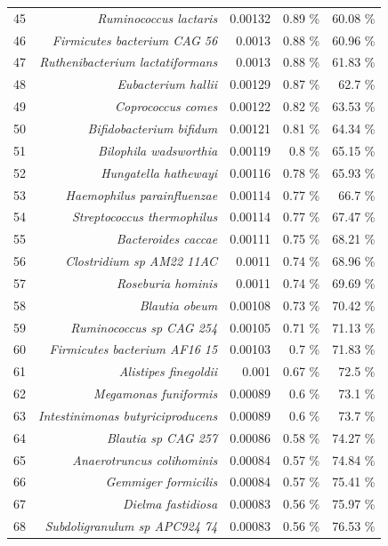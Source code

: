 \documentclass{article}
\begin{document}
\begin{table}
\begin{centering}
\begin{tabular}{|r|r|r|r|r|}
  45 & \textit{Ruminococcus lactaris} & 0.00132 & 0.89 \% & 60.08 \% \\
  46 & \textit{Firmicutes bacterium CAG 56} & 0.0013 & 0.88 \% & 60.96 \% \\
  47 & \textit{Ruthenibacterium lactatiformans} & 0.0013 & 0.88 \% & 61.83 \% \\
  48 & \textit{Eubacterium hallii} & 0.00129 & 0.87 \% & 62.7 \% \\
  49 & \textit{Coprococcus comes} & 0.00122 & 0.82 \% & 63.53 \% \\
  50 & \textit{Bifidobacterium bifidum} & 0.00121 & 0.81 \% & 64.34 \% \\
  51 & \textit{Bilophila wadsworthia} & 0.00119 & 0.8 \% & 65.15 \% \\
  52 & \textit{Hungatella hathewayi} & 0.00116 & 0.78 \% & 65.93 \% \\
  53 & \textit{Haemophilus parainfluenzae} & 0.00114 & 0.77 \% & 66.7 \% \\
  54 & \textit{Streptococcus thermophilus} & 0.00114 & 0.77 \% & 67.47 \% \\
  55 & \textit{Bacteroides caccae} & 0.00111 & 0.75 \% & 68.21 \% \\
  56 & \textit{Clostridium sp AM22 11AC} & 0.0011 & 0.74 \% & 68.96 \% \\
  57 & \textit{Roseburia hominis} & 0.0011 & 0.74 \% & 69.69 \% \\
  58 & \textit{Blautia obeum} & 0.00108 & 0.73 \% & 70.42 \% \\
  59 & \textit{Ruminococcus sp CAG 254} & 0.00105 & 0.71 \% & 71.13 \% \\
  60 & \textit{Firmicutes bacterium AF16 15} & 0.00103 & 0.7 \% & 71.83 \% \\
  61 & \textit{Alistipes finegoldii} & 0.001 & 0.67 \% & 72.5 \% \\
  62 & \textit{Megamonas funiformis} & 0.00089 & 0.6 \% & 73.1 \% \\
  63 & \textit{Intestinimonas butyriciproducens} & 0.00089 & 0.6 \% & 73.7 \% \\
  64 & \textit{Blautia sp CAG 257} & 0.00086 & 0.58 \% & 74.27 \% \\
  65 & \textit{Anaerotruncus colihominis} & 0.00084 & 0.57 \% & 74.84 \% \\
  66 & \textit{Gemmiger formicilis} & 0.00084 & 0.57 \% & 75.41 \% \\
  67 & \textit{Dielma fastidiosa} & 0.00083 & 0.56 \% & 75.97 \% \\
  68 & \textit{Subdoligranulum sp APC924 74} & 0.00083 & 0.56 \% & 76.53 \% \\

\end{tabular}
\end{centering}
\end{table}
\end{document}
